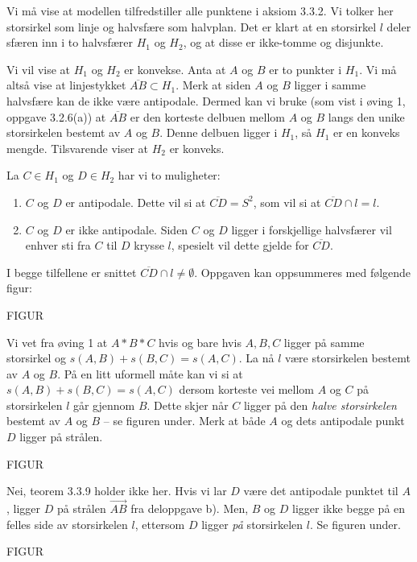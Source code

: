 \begin{oppgave}[3.3.4]
  \begin{punkt}
    Vi må vise at modellen tilfredstiller alle punktene i aksiom 3.3.2. Vi tolker her storsirkel som
    linje og halvsfære som halvplan. Det er klart at en storsirkel $l$ deler sfæren inn i to halvsfærer
    $H_1$ og $H_2$, og at disse er ikke-tomme og disjunkte. 

    Vi vil vise at $H_1$ og $H_2$ er konvekse. Anta at $A$ og $B$ er to punkter i $H_1$. Vi må altså 
    vise at linjestykket $\overline{AB}\subset H_1$. Merk at siden $A$ og $B$ ligger i samme halvsfære
    kan de ikke være antipodale. Dermed kan vi bruke (som vist i øving 1, oppgave 3.2.6(a)) at
    $\overline{AB}$ er den korteste delbuen mellom $A$ og $B$ langs den unike storsirkelen bestemt av 
    $A$ og $B$. Denne delbuen ligger i $H_1$, så $H_1$ er en konveks mengde. Tilsvarende viser at $H_2$
    er konveks. 

    La $C\in H_1$ og $D\in H_2$ har vi to muligheter: 
    \begin{enumerate}
      \item $C$ og $D$ er antipodale. Dette vil si at $\overline{CD} = S^2$, som vil si at
      $\overline{CD}\cap l = l$. 

      \item $C$ og $D$ er ikke antipodale. Siden $C$ og $D$ ligger i forskjellige halvsfærer vil 
      enhver sti fra $C$ til $D$ krysse $l$, spesielt vil dette gjelde for $\overline{CD}$. 
    \end{enumerate}

    I begge tilfellene er snittet $\overline{CD}\cap l\neq \emptyset$. Oppgaven kan oppsummeres med
    følgende figur: 

    FIGUR
  \end{punkt}

  \begin{punkt}
    Vi vet fra øving 1 at $A\ast B\ast C$ hvis og bare hvis $A, B, C$ ligger på samme storsirkel og 
    $s(A, B)+s(B,C) = s(A,C)$. La nå $l$ være storsirkelen bestemt av $A$ og $B$. På en litt uformell
    måte kan vi si at $s(A, B)+s(B, C) = s(A, C)$ dersom korteste vei mellom $A$ og $C$ på storsirkelen
    $l$ går gjennom $B$. Dette skjer når $C$ ligger på den \emph{halve storsirkelen} bestemt av $A$ og 
    $B$ -- se figuren under. Merk at både $A$ og dets antipodale punkt $D$ ligger på strålen. 

    FIGUR
  \end{punkt}

  \begin{punkt}
    Nei, teorem 3.3.9 holder ikke her. Hvis vi lar $D$ være det antipodale punktet til $A$, ligger $D$
    på strålen $\overrightarrow{AB}$ fra deloppgave b). Men, $B$ og $D$ ligger ikke begge på en felles
    side av storsirkelen $l$, ettersom $D$ ligger \emph{på} storsirkelen $l$. Se figuren under.

    FIGUR
  \end{punkt}
\end{oppgave}

